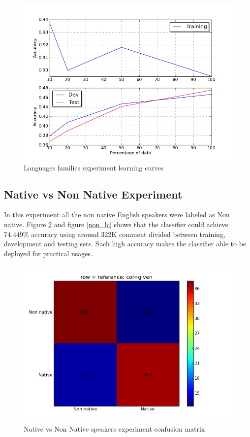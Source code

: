 \documentclass[11pt]{article}
\begin{document}
\begin{figure}[htp]
\centering
\includegraphics[scale=0.45]{family_lc.png}
\caption{Languages families experiment learning curves}
\label{fam_lc}
\end{figure}

\subsection{Native vs Non Native Experiment}
In this experiment all the non native English speakers were labeled as Non native. Figure \ref{non_cfm} and figure \ref{non_lc} shows that the classifier could achieve $74.449\%$ accuracy using around 322K comment divided between training, development and testing sets. Such high accuracy makes the classifier able to be deployed for practical usages.


\begin{figure}[htp]
\centering
\includegraphics[scale=0.45]{native_cfm.png}
\caption{Native vs Non Native speakers experiment confusion matrix}
\label{non_cfm}
\end{figure}
\end{document}
